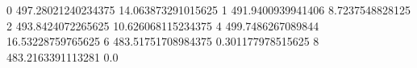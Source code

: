 0 497.28021240234375 14.063873291015625
1 491.9400939941406 8.7237548828125
2 493.8424072265625 10.626068115234375
4 499.7486267089844 16.53228759765625
6 483.51751708984375 0.301177978515625
8 483.2163391113281 0.0
